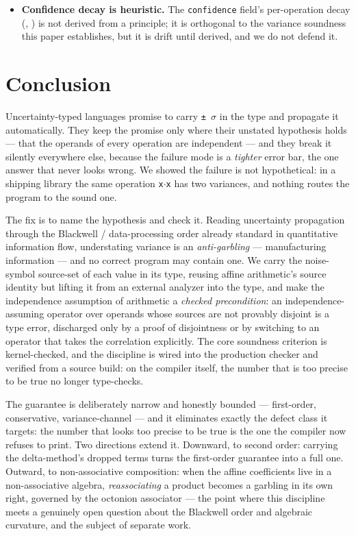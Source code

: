 \documentclass[sigplan,review,anonymous,10pt]{acmart}
\begin{document}
\begin{itemize}
  \item \textbf{Confidence decay is heuristic.} The \texttt{confidence} field's per-operation decay (, ) is not derived from a principle; it is orthogonal to the variance soundness this paper establishes, but it is drift until derived, and we do not defend it.
\end{itemize}

\section{Conclusion}

Uncertainty-typed languages promise to carry \texttt{± $\sigma$} in the type and propagate it automatically. They keep the promise only where their unstated hypothesis holds --- that the operands of every operation are independent --- and they break it silently everywhere else, because the failure mode is a \emph{tighter} error bar, the one answer that never looks wrong. We showed the failure is not hypothetical: in a shipping library the same operation \texttt{x$\cdot$x} has two variances, and nothing routes the program to the sound one.

The fix is to name the hypothesis and check it. Reading uncertainty propagation through the Blackwell / data-processing order already standard in quantitative information flow, understating variance is an \emph{anti-garbling} --- manufacturing information --- and no correct program may contain one. We carry the noise-symbol source-set of each value in its type, reusing affine arithmetic's source identity but lifting it from an external analyzer into the type, and make the independence assumption of arithmetic a \emph{checked precondition}: an independence-assuming operator over operands whose sources are not provably disjoint is a type error, discharged only by a proof of disjointness or by switching to an operator that takes the correlation explicitly. The core soundness criterion is kernel-checked, and the discipline is wired into the production checker and verified from a source build: on the compiler itself, the number that is too precise to be true no longer type-checks.

The guarantee is deliberately narrow and honestly bounded --- first-order, conservative, variance-channel --- and it eliminates exactly the defect class it targets: the number that looks too precise to be true is the one the compiler now refuses to print. Two directions extend it. Downward, to second order: carrying the delta-method's dropped terms turns the first-order guarantee into a full one. Outward, to non-associative composition: when the affine coefficients live in a non-associative algebra, \emph{reassociating} a product becomes a garbling in its own right, governed by the octonion associator --- the point where this discipline meets a genuinely open question about the Blackwell order and algebraic curvature, and the subject of separate work.
\end{document}
